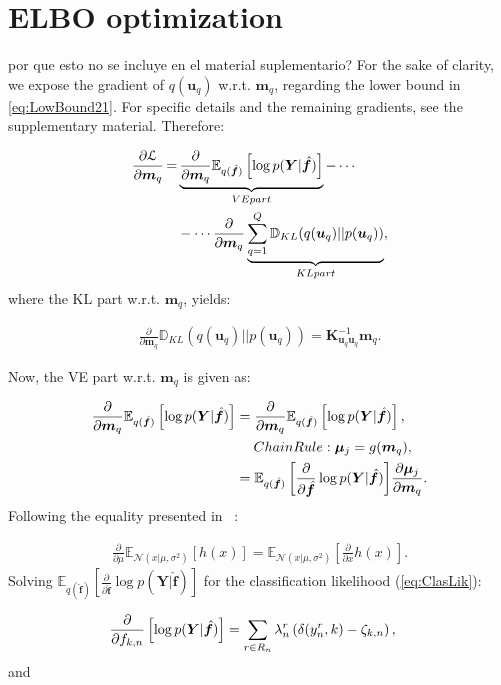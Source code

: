 \documentclass[journal]{IEEEtran}
\providecommand{\ve}[1]{{\bm{#1}}}%
\providecommand{\mat}[1]{{\bm{#1}}} %
\DeclareMathOperator{\igual}{\!\,=\!\,}
\providecommand{\ve}[1]{{\mathbf{#1}}}
\providecommand{\mat}[1]{{\mathbf{#1}}}
\newcommand{\fracpartial}[2]{\frac{\partial #1}{\partial  #2}} %
\newcommand{\gauss}{\mathcal{N}} %
\newcommand{\comment}[2]{{\color{blue}#1} {\color{red}#2}}
\begin{document}
\section{ELBO optimization}
\comment{}{por que esto no se incluye en el material suplementario?}
For the sake of clarity, we expose the gradient of $q(\ve{u}_q)$ w.r.t. $\ve{m}_q$, regarding the lower bound in \cref{eq:LowBound21}. For specific details and the remaining gradients, see the supplementary material. Therefore:


\begin{align}
\notag\fracpartial{\mathcal{L}}{\ve{m}_q} \igual& \underbrace{\fracpartial{}{\ve{m}_q}\mathbb{E}_{q(\hat{\ve{f}})}\left[\log p(\mat{Y}|\hat{\ve{f}})\right]}_{\mbox{VE part}} - \cdots\\
& - \cdots \fracpartial{}{\ve{m}_q}\underbrace{\sum_{q=1}^{Q}\mathbb{D}_{KL}(q(\ve{u}_q)||p(\ve{u}_q))}_{\mbox{KL part}},
\end{align}
where the KL part w.r.t. $\ve{m}_q$, yields:

\begin{align}
\fracpartial{}{\ve{m}_q}{\mathbb{D}_{KL}(q(\ve{u}_q)||p(\ve{u}_q))} = \mat{K}_{\ve{u}_q\ve{u}_q}^{-1}\ve{m}_q.
\end{align}

Now, the VE part w.r.t. $\ve{m}_q$ is given as:

\begin{align}
\notag\fracpartial{}{\ve{m}_q}\mathbb{E}_{q(\hat{\ve{f}})}\left[\log p(\mat{Y}|\hat{\ve{f}})\right] &= \fracpartial{}{\ve{m}_q}\mathbb{E}_{q(\hat{\ve{f}})}\left[\log p(\mat{Y}|\hat{\ve{f}})\right],\\
\notag&\quad\; \mbox{Chain Rule:}\; \bm{\mu}_j=g(\ve{m}_q),\\
&= {\mathbb{E}_{q(\hat{\ve{f}})}\left[\fracpartial{}{\hat{\ve{f}}}\log p(\mat{Y}|\hat{\ve{f}})\right]} \fracpartial{\bm{\mu}_j}{\ve{m}_q}.
\end{align}
Following the equality presented in ~\cite{hensman2015scalable}:

\begin{align}
\fracpartial{}{\mu}\mathbb{E}_{\gauss(x|\mu,\sigma^2)}\left[h(x)\right] = \mathbb{E}_{\gauss(x|\mu,\sigma^2)}\left[\fracpartial{}{x}h(x)\right].
\end{align}
Solving $\mathbb{E}_{q(\hat{\ve{f}})}\left[\fracpartial{}{\hat{\ve{f}}}\log p(\mat{Y}|\hat{\ve{f}})\right]$ for the classification likelihood (\cref{eq:ClasLik}):

\begin{align}
		\notag\fracpartial{}{f_{k,n}}\left[\log p(\mat{Y}|\hat{\ve{f}})\right] &=\sum_{r\in R_n}{\lambda}_n^r\left(\delta(y_n^r,k)-\zeta_{k,n}\right),
\end{align}
and
\end{document}
